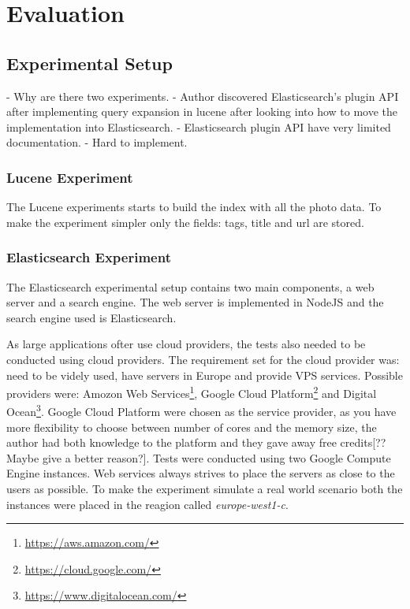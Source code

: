 \chapter{Evaluation}
\label{ch:evaluation}

\section{Experimental Setup}
- Why are there two experiments.
- Author discovered Elasticsearch's plugin API after implementing query expansion in lucene after looking into how to move the implementation into Elasticsearch.
- Elasticsearch plugin API have very limited documentation.
- Hard to implement.

\subsection{Lucene Experiment}
The Lucene experiments starts to build the index with all the photo data.
To make the experiment simpler only the fields: tags, title and url are stored.

\subsection{Elasticsearch Experiment}
The Elasticsearch experimental setup contains two main components, a web server and a search engine.
The web server is implemented in NodeJS and the search engine used is Elasticsearch.

As large applications ofter use cloud providers, the tests also needed to be conducted using cloud providers.
The requirement set for the cloud provider was: need to be videly used, have servers in Europe and provide VPS services.
Possible providers were: Amozon Web Services\footnote{\url{https://aws.amazon.com/}},
Google Cloud Platform\footnote{\url{https://cloud.google.com/}} and Digital Ocean\footnote{\url{https://www.digitalocean.com/}}.
Google Cloud Platform were chosen as the service provider, as you have more flexibility to choose between number of cores and the memory size,
the author had both knowledge to the platform and they gave away free credits[?? Maybe give a better reason?].
Tests were conducted using two Google Compute Engine instances.
Web services always strives to place the servers as close to the users as possible.
To make the experiment simulate a real world scenario both the instances were placed in the reagion called \textit{europe-west1-c}.

